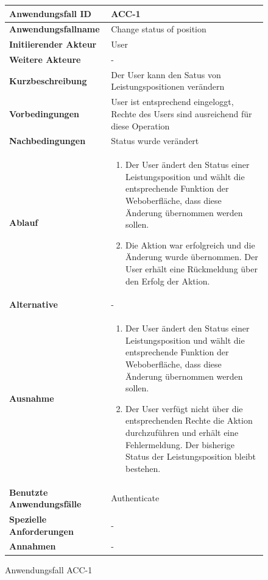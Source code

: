 \newpage

\begin{figure}[h]
	\centering
	\begin{tabularx}{\textwidth}{ X | X }
		\textbf{Anwendungsfall ID} & ACC-1 \\ \hline
		\textbf{Anwendungsfallname} & Change status of position\\ \hline
		\textbf{Initiierender Akteur} & User \\ \hline
		\textbf{Weitere Akteure} & -  \\ \hline
		\textbf{Kurzbeschreibung} & Der User kann den Satus von Leistungspositionen ver\"andern \\ \hline
		\textbf{Vorbedingungen} & User ist entsprechend eingeloggt, Rechte des Users sind ausreichend f\"ur diese Operation \\ \hline
		\textbf{Nachbedingungen} & Status wurde ver\"andert \\ \hline
		\textbf{Ablauf} &
		\begin{enumerate}
			\item Der User \"andert den Status einer Leistungsposition und w\"ahlt die entsprechende Funktion der Weboberfl\"ache, dass diese \"Anderung \"ubernommen werden sollen.
			\item Die Aktion war erfolgreich und die \"Anderung wurde \"ubernommen.  Der User erh\"alt eine R\"uckmeldung \"uber den Erfolg der Aktion.
		\end{enumerate} \\ \hline
		\textbf{Alternative} & -
		\\ \hline
		\textbf{Ausnahme} &
		\begin{enumerate}
			\item Der User \"andert den Status einer Leistungsposition und w\"ahlt die entsprechende Funktion der Weboberfl\"ache,  dass diese \"Anderung \"ubernommen werden sollen.
			\item Der User verf\"ugt nicht \"uber die entsprechenden Rechte die Aktion durchzuf\"uhren und erh\"alt eine Fehlermeldung. Der bisherige Status der Leistungsposition bleibt bestehen.
		\end{enumerate}  \\ \hline
		\textbf{Benutzte Anwendungsfälle} & Authenticate \\ \hline
		\textbf{Spezielle Anforderungen} & - \\ \hline
		\textbf{Annahmen} & -
	\end{tabularx}
	\caption{Anwendungsfall ACC-1}
	\label{fig:anwendungsfall-server-tabelle-ACC-1}
\end{figure}


